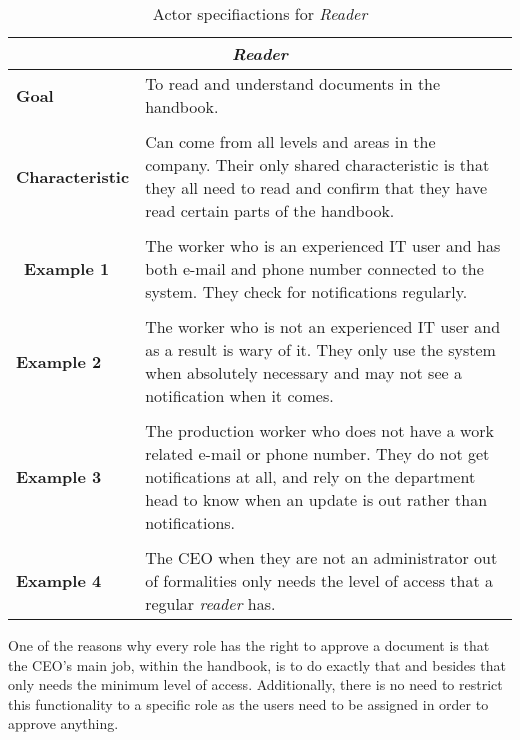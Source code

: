 \begin{table}[H]
	\begin{tabular}{l p{11.3cm}}
		\hline
		\multicolumn{2}{c}{\textbf{\textit{Reader}}}\\
		\hline

		\textbf{Goal} & To read and understand documents in the handbook. \\
		&  \\

		\textbf{Characteristic} & Can come from all levels and areas in the company.
		Their only shared characteristic is that they all need to read and confirm that they have read certain parts of the handbook.\\
		&  \\
		\
		\textbf{Example 1}
		& The worker who is an experienced IT user and has both e-mail and phone number connected to the system.
		They check for notifications regularly.\\
		&  \\

		\textbf{Example 2}
		& The worker who is not an experienced IT user and as a result is wary of it.
		They only use the system when absolutely necessary and may not see a notification when it comes.\\

		&  \\
		\textbf{Example 3}
		& The production worker who does not have a work related e-mail or phone number.
		They do not get notifications at all, and rely on the department head to know when an update is out rather than notifications.\\
		&  \\

		\textbf{Example 4}
		& The CEO when they are not an administrator out of formalities only needs the level of access that a regular \textit{reader} has.\\

		\hline
	\end{tabular}
	\caption{Actor specifiactions for \textit{Reader}}\label{tab:Actor-reader}
\end{table}

One of the reasons why every role has the right to approve a document is that the CEO's main job, within the handbook, is to do exactly that and besides that only needs the minimum level of access.
Additionally, there is no need to restrict this functionality to a specific role as the users need to be assigned in order to approve anything.
